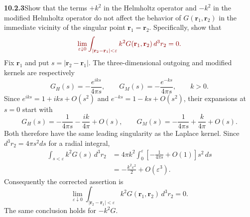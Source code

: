 \par\bigskip
\noindent\textbf{10.2.3}\quad Show that the terms $+k^{2}$ in the Helmholtz
operator and $-k^{2}$ in the modified Helmholtz operator do not affect the
behavior of $G(\mathbf{r}_{1},\mathbf{r}_{2})$ in the immediate vicinity of
the singular point $\mathbf{r}_{1}=\mathbf{r}_{2}$. Specifically, show that
\[
\erratum{\lim_{\varepsilon\downarrow0}
\int_{|\mathbf{r}_{2}-\mathbf{r}_{1}|<\varepsilon}
k^{2}G(\mathbf{r}_{1},\mathbf{r}_{2})\,d^{3}r_{2}=0.}
\]
\solution
{}
Fix $\mathbf r_1$ and put $s=|\mathbf r_2-\mathbf r_1|$.
The three-dimensional outgoing and modified kernels are respectively
\[
G_H(s)=-\frac{e^{iks}}{4\pi s},\qquad
G_M(s)=-\frac{e^{-ks}}{4\pi s},\qquad k>0.
\]
Since $e^{iks}=1+iks+O(s^2)$ and $e^{-ks}=1-ks+O(s^2)$, their
expansions at $s=0$ start with
\[
G_H(s)=-\frac1{4\pi s}-\frac{ik}{4\pi}+O(s),\qquad
G_M(s)=-\frac1{4\pi s}+\frac{k}{4\pi}+O(s).
\]
Both therefore have the same leading singularity as the Laplace kernel.
Since $d^3r_2=4\pi s^2ds$ for a radial integral,
\begin{align*}
\int_{s<\varepsilon}k^2G(s)\,d^3r_2
&=4\pi k^2\int_0^\varepsilon
\left[-\frac1{4\pi s}+O(1)\right]s^2\,ds\\
&=-\frac{k^2\varepsilon^2}{2}+O(\varepsilon^3).
\end{align*}
Consequently the corrected assertion is
\[
\boxed{\lim_{\varepsilon\downarrow0}
\int_{|\mathbf r_2-\mathbf r_1|<\varepsilon}
k^2G(\mathbf r_1,\mathbf r_2)\,d^3r_2=0.}
\]
The same conclusion holds for $-k^2G$.

